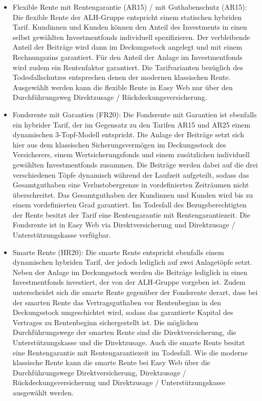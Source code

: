 \begin{itemize}
\item Flexible Rente mit Rentengarantie (AR15) / mit Guthabenschutz (AR15): Die flexible Rente der ALH-Gruppe entspricht einem statischen hybriden Tarif. Kundinnen und Kunden können den Anteil des Investments in einen selbst gewählten Investmentfonds individuell spezifizieren. Der verbleibende Anteil der Beiträge wird dann im Deckungsstock angelegt und mit einem Rechnungszins garantiert. Für den Anteil der Anlage im Investmentfonds wird zudem ein Rentenfaktor garantiert. Die Tarifvarianten bezüglich des Todesfallschutzes entsprechen denen der modernen klassischen Rente. Ausgewählt werden kann die flexible Rente in Easy Web nur über den Durchführungsweg Direktzusage / Rückdeckungsversicherung.
\item Fondsrente mit Garantien (FR20): Die Fondsrente mit Garantien ist ebenfalls ein hybrider Tarif, der im Gegensatz zu den Tarifen AR15 und AR25 einem \glqq dynamischen 3-Topf-Modell\grqq{} entspricht. Die Anlage der Beiträge setzt sich hier aus dem klassischen Sicherungsvermögen im Deckungsstock des Versicherers, einem Wertsicherungsfonds und einem zusätzlichen individuell gewählten Investmentfonds zusammen. Die Beiträge werden dabei auf die drei verschiedenen Töpfe dynamisch während der Laufzeit aufgeteilt, sodass das Gesamtguthaben eine Verlustobergrenze in vordefinierten Zeiträumen nicht überschreitet. Das Gesamtguthaben der Kundinnen und Kunden wird bis zu einem vordefinierten Grad garantiert. Im Todesfall des Bezugsberechtigten der Rente besitzt der Tarif eine Rentengarantie mit Rentengarantiezeit. Die Fondsrente ist in Easy Web via Direktversicherung und Direktzusage / Unterstützungskasse verfügbar.
\item Smarte Rente (HR20): Die smarte Rente entspricht ebenfalls einem dynamischen hybriden Tarif, der jedoch lediglich auf zwei Anlagetöpfe setzt. Neben der Anlage im Deckungsstock werden die Beiträge lediglich in einen Investmentfonds investiert, der von der ALH-Gruppe vorgeben ist. Zudem unterscheidet sich die smarte Rente gegenüber der Fondsrente derart, dass bei der smarten Rente das Vertragsguthaben vor Rentenbeginn in den Deckungsstock umgeschichtet wird, sodass das garantierte Kapital des Vertrages zu Rentenbeginn sichergestellt ist. Die möglichen Durchführungswege der smarten Rente sind die Direktversicherung, die Unterstützungskasse und die Direktzusage. Auch die smarte Rente besitzt eine Rentengarantie mit Rentengarantiezeit im Todesfall. Wie die moderne klassische Rente kann die smarte Rente bei Easy Web über die Durchführungswege Direktversicherung, Direktzusage / Rückdeckungsversicherung und Direktzusage / Unterstützungskasse ausgewählt werden.
\end{itemize}

